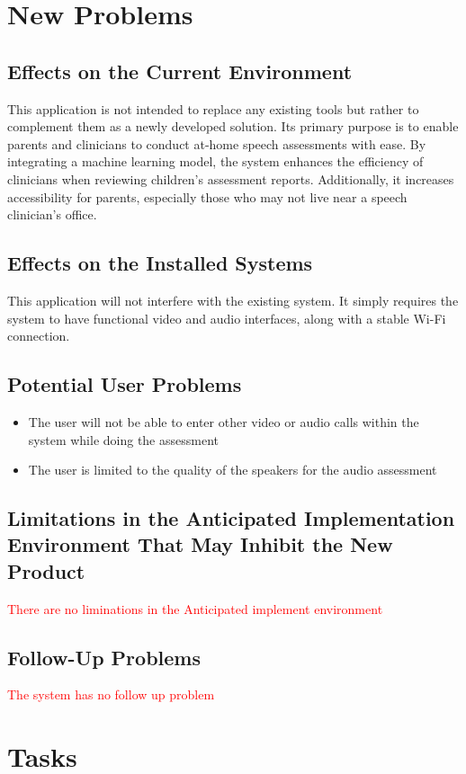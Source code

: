 \documentclass[12pt]{article}
\begin{document}
\section{New Problems}
\subsection{Effects on the Current Environment}
\hspace{2em}This application is not intended to replace any existing tools but rather to complement 
them as a newly developed solution. Its primary purpose is to enable parents and clinicians to 
conduct at-home speech assessments with ease. By integrating a machine learning model, the system 
enhances the efficiency of clinicians when reviewing children's assessment reports. 
Additionally, it increases accessibility for parents, especially those who may not live near a speech clinician's office.
\subsection{Effects on the Installed Systems}
\hspace{2em}This application will not interfere with the existing system. It simply requires the system to have functional video and audio interfaces, along with a stable Wi-Fi connection.
\subsection{Potential User Problems}
\begin{itemize}
  \item The user will not be able to enter other video or audio calls within the system while doing the assessment
  \item The user is limited to the quality of the speakers for the audio assessment
\end{itemize}
\subsection{Limitations in the Anticipated Implementation Environment That May
Inhibit the New Product}
\textcolor{red}{There are no liminations in the Anticipated implement environment}
\subsection{Follow-Up Problems}
\textcolor{red}{The system has no follow up problem}
\section{Tasks}
\end{document}
